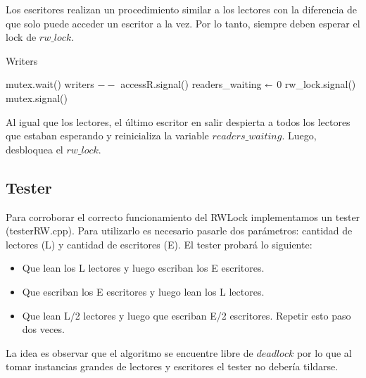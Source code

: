 Los escritores realizan un procedimiento similar a los lectores con la diferencia de que solo puede acceder un escritor a la vez. Por lo tanto, siempre deben esperar el lock de $rw\_lock$.

\begin{algorithm}[H]
\caption{Writers}\label{ej1}
\begin{algorithmic}[1]
	\State mutex.wait()
	\State writers $--$
				\State accessR.signal()
			\EndFor
			\State readers\_waiting $\shortleftarrow$ 0
		\EndIf
	\EndIf
	\State rw\_lock.signal()
	\State mutex.signal()
\EndProcedure
\end{algorithmic}
\end{algorithm}

Al igual que los lectores, el último escritor en salir despierta a todos los lectores que estaban esperando y reinicializa la variable $readers\_waiting$. Luego, desbloquea el $rw\_lock$.

\subsection{Tester}

Para corroborar el correcto funcionamiento del RWLock implementamos un tester (testerRW.cpp). Para utilizarlo es necesario pasarle dos parámetros: cantidad de lectores (L) y cantidad de escritores (E). El tester probará lo siguiente:

\begin{itemize}
	\item Que lean los L lectores y luego escriban los E escritores.
	\item Que escriban los E escritores y luego lean los L lectores.
	\item Que lean L/2 lectores y luego que escriban E/2 escritores. Repetir esto paso dos veces.
\end{itemize}

La idea es observar que el algoritmo se encuentre libre de $deadlock$ por lo que al tomar instancias grandes de lectores y escritores el tester no debería tildarse.




